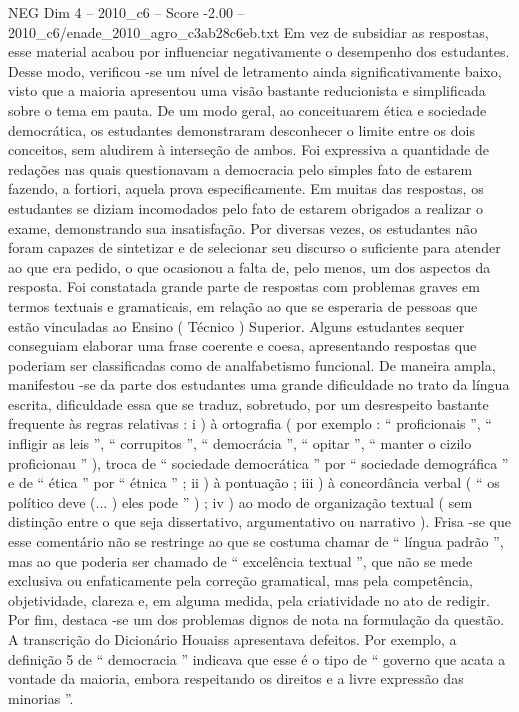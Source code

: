 \begin{textsample}{NEG Dim 4 – 2010\_c6 – Score -2.00 – 2010\_c6/enade\_2010\_agro\_c3ab28c6eb.txt}
Em vez de subsidiar as respostas, esse material acabou por influenciar negativamente o desempenho dos estudantes.
Desse modo, verificou -se um nível de letramento ainda significativamente baixo, visto que a maioria apresentou uma visão bastante reducionista e simplificada sobre o tema em pauta.
De um modo geral, ao conceituarem ética e sociedade democrática, os estudantes demonstraram desconhecer o limite entre os dois conceitos, sem aludirem à interseção de ambos.
Foi expressiva a quantidade de redações nas quais questionavam a democracia pelo simples fato de estarem fazendo, a fortiori, aquela prova especificamente.
Em muitas das respostas, os estudantes se diziam incomodados pelo fato de estarem obrigados a realizar o exame, demonstrando sua insatisfação.
Por diversas vezes, os estudantes não foram capazes de sintetizar e de selecionar seu discurso o suficiente para atender ao que era pedido, o que ocasionou a falta de, pelo menos, um dos aspectos da resposta.
Foi constatada grande parte de respostas com problemas graves em termos textuais e gramaticais, em relação ao que se esperaria de pessoas que estão vinculadas ao Ensino ( Técnico ) Superior.
Alguns estudantes sequer conseguiam elaborar uma frase coerente e coesa, apresentando respostas que poderiam ser classificadas como de analfabetismo funcional.
De maneira ampla, manifestou -se da parte dos estudantes uma grande dificuldade no trato da língua escrita, dificuldade essa que se traduz, sobretudo, por um desrespeito bastante frequente às regras relativas : i ) à ortografia ( por exemplo : “ proficionais ”, “ infligir as leis ”, “ corrupitos ”, “ democrácia ”, “ opitar ”, “ manter o cizilo proficionau ” ), troca de “ sociedade democrática ” por “ sociedade demográfica ” e de “ ética ” por “ étnica ” ; ii ) à pontuação ; iii ) à concordância verbal ( “ os político deve (... ) eles pode ” ) ; iv ) ao modo de organização textual ( sem distinção entre o que seja dissertativo, argumentativo ou narrativo ).
Frisa -se que esse comentário não se restringe ao que se costuma chamar de “ língua padrão ”, mas ao que poderia ser chamado de “ excelência textual ”, que não se mede exclusiva ou enfaticamente pela correção gramatical, mas pela competência, objetividade, clareza e, em alguma medida, pela criatividade no ato de redigir.
Por fim, destaca -se um dos problemas dignos de nota na formulação da questão.
A transcrição do Dicionário Houaiss apresentava defeitos.
Por exemplo, a definição 5 de “ democracia ” indicava que esse é o tipo de “ governo que acata a vontade da maioria, embora respeitando os direitos e a livre expressão das minorias ”.

\end{textsample}
